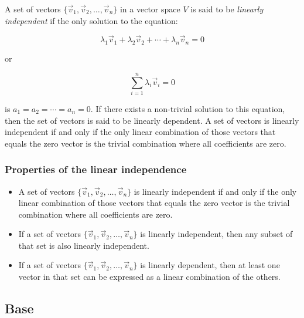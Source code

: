 A set of vectors \(\{\vec{v}_1, \vec{v}_2, \dots, \vec{v}_n\}\) in a vector space \(V\) is said to 
be \emph{linearly independent} if the only solution to the equation:

\[
	\lambda_1\vec{v}_1 + \lambda_2\vec{v}_2 + \cdots + \lambda_n\vec{v}_n = 0
\]

or

\[
	\sum_{i=1}^n \lambda_i \vec{v}_i = 0
\]

is \(a_1 = a_2 = \cdots = a_n = 0\). If there exists a non-trivial solution to this equation, 
then the set of vectors is said to be linearly dependent. A set of vectors is linearly 
independent if and only if the only linear combination of those vectors that equals the zero vector 
is the trivial combination where all coefficients are zero.

\subsubsection{Properties of the linear independence}

\begin{itemize}

	\item A set of vectors \(\{\vec{v}_1, \vec{v}_2, \ldots, \vec{v}_n\}\) is linearly independent 
	      if and only if the only linear combination of those vectors that equals the zero vector is 
		  the trivial combination where all coefficients are zero.

	\item If a set of vectors \(\{\vec{v}_1, \vec{v}_2, \ldots, \vec{v}_n\}\) is linearly independent, 
	      then any subset of that set is also linearly independent.

	\item If a set of vectors \(\{\vec{v}_1, \vec{v}_2, \ldots, \vec{v}_n\}\) is linearly dependent, 
	      then at least one vector in that set can be expressed as a linear combination of the others.

\end{itemize}

\subsection{Base}

